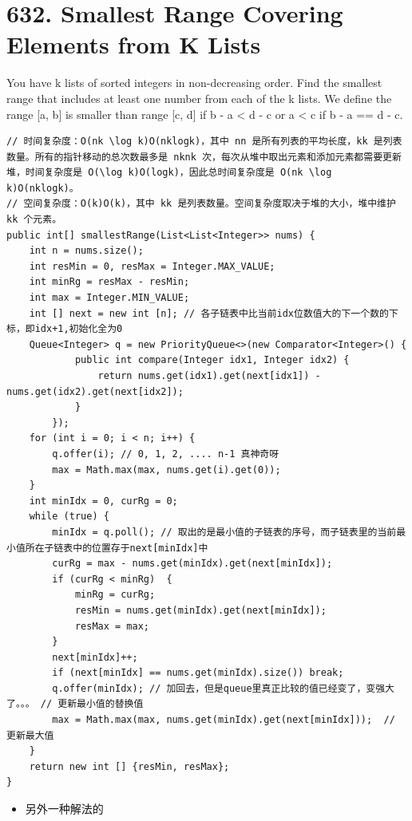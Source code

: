 \documentclass[9pt, b5paaper]{book}
\begin{document}
\section{632. Smallest Range Covering Elements from K Lists}
\label{sec-3-2}
You have k lists of sorted integers in non-decreasing order. Find the smallest range that includes at least one number from each of the k lists.
We define the range [a, b] is smaller than range [c, d] if b - a < d - c or a < c if b - a == d - c.
\begin{verbatim}
// 时间复杂度：O(nk \log k)O(nklogk)，其中 nn 是所有列表的平均长度，kk 是列表数量。所有的指针移动的总次数最多是 nknk 次，每次从堆中取出元素和添加元素都需要更新堆，时间复杂度是 O(\log k)O(logk)，因此总时间复杂度是 O(nk \log k)O(nklogk)。
// 空间复杂度：O(k)O(k)，其中 kk 是列表数量。空间复杂度取决于堆的大小，堆中维护 kk 个元素。
public int[] smallestRange(List<List<Integer>> nums) {
    int n = nums.size();
    int resMin = 0, resMax = Integer.MAX_VALUE;
    int minRg = resMax - resMin;
    int max = Integer.MIN_VALUE;
    int [] next = new int [n]; // 各子链表中比当前idx位数值大的下一个数的下标，即idx+1,初始化全为0
    Queue<Integer> q = new PriorityQueue<>(new Comparator<Integer>() {
            public int compare(Integer idx1, Integer idx2) {
                return nums.get(idx1).get(next[idx1]) - nums.get(idx2).get(next[idx2]);
            }
        });
    for (int i = 0; i < n; i++) {
        q.offer(i); // 0, 1, 2, .... n-1 真神奇呀
        max = Math.max(max, nums.get(i).get(0));
    }
    int minIdx = 0, curRg = 0;
    while (true) {
        minIdx = q.poll(); // 取出的是最小值的子链表的序号，而子链表里的当前最小值所在子链表中的位置存于next[minIdx]中
        curRg = max - nums.get(minIdx).get(next[minIdx]);
        if (curRg < minRg)  {
            minRg = curRg;
            resMin = nums.get(minIdx).get(next[minIdx]);
            resMax = max;
        }
        next[minIdx]++;
        if (next[minIdx] == nums.get(minIdx).size()) break;
        q.offer(minIdx); // 加回去，但是queue里真正比较的值已经变了，变强大了。。。 // 更新最小值的替换值 
        max = Math.max(max, nums.get(minIdx).get(next[minIdx]));  // 更新最大值
    }
    return new int [] {resMin, resMax};
}
\end{verbatim}
\begin{itemize}
\item 另外一种解法的
\end{itemize}
\end{document}
